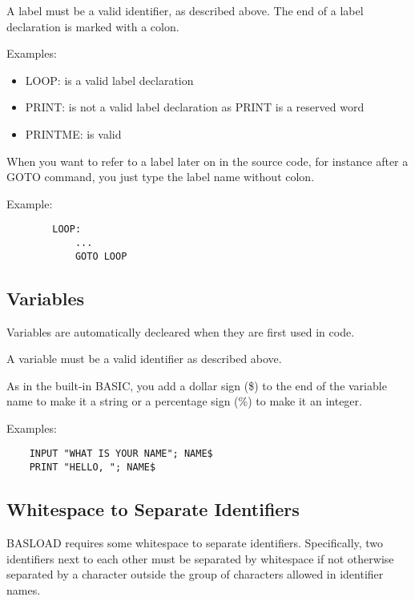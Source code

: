 \documentclass{article}
\begin{document}
        A label must be a valid identifier, as described above. The end of
        a label declaration is marked with a colon.

        Examples:

        \begin{itemize}
            \item LOOP: is a valid label declaration
            \item PRINT: is not a valid label declaration as PRINT is a reserved word
            \item PRINTME: is valid
        \end{itemize}

        When you want to refer to a label later on in the source code, for
        instance after a GOTO command, you just type the label name without
        colon.

        Example:

        \begin{verbatim}
        LOOP:
            ...
            GOTO LOOP
        \end{verbatim}

    \subsection{Variables}

        Variables are automatically decleared when they are first used in
        code.

        A variable must be a valid identifier as described above.

        As in the built-in BASIC, you add a dollar sign (\$) to the end
        of the variable name to make it a string or a percentage sign (\%)
        to make it an integer.

        Examples:

        \begin{verbatim}
    INPUT "WHAT IS YOUR NAME"; NAME$
    PRINT "HELLO, "; NAME$
        \end{verbatim}

    \subsection{Whitespace to Separate Identifiers}

        BASLOAD requires some whitespace to separate identifiers. 
        Specifically, two identifiers next to each other must
        be separated by whitespace if not otherwise separated by
        a character outside the group of characters allowed in
        identifier names.
\end{document}
